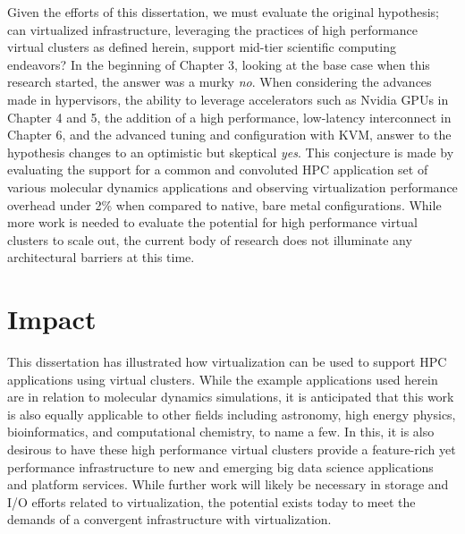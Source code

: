 Given the efforts of this dissertation, we must evaluate the original hypothesis; can virtualized infrastructure, leveraging the practices of high performance virtual clusters as defined herein, support mid-tier scientific computing endeavors? In the beginning of Chapter 3, looking at the base case when this research started, the answer was a murky \emph{no}.  When considering the advances made in hypervisors, the ability to leverage accelerators such as Nvidia GPUs in Chapter 4 and 5, the addition of a high performance, low-latency interconnect in Chapter 6, and the advanced tuning and configuration with KVM, answer to the hypothesis changes to an optimistic but skeptical \emph{yes}.  This conjecture is made by evaluating the support for a common and convoluted HPC application set of various molecular dynamics applications and observing virtualization performance overhead under 2\% when compared to native, bare metal configurations.  While more work is needed to evaluate the potential for high performance virtual clusters to scale out, the current body of research does not illuminate any architectural barriers at this time.  





\section{Impact}
\label{sec:impact}

This dissertation has illustrated how virtualization can be used to support HPC applications using virtual clusters.  While the example applications used herein are in relation to molecular dynamics simulations, it is anticipated that this work is also equally applicable to other fields including astronomy, high energy physics, bioinformatics, and computational chemistry, to name a few. In this, it is also desirous to have these high performance virtual clusters provide a feature-rich yet performance infrastructure to new and emerging big data science applications and platform services.  While further work will likely be necessary in storage and I/O efforts related to virtualization, the potential exists today to meet the demands of a convergent infrastructure with virtualization.   

